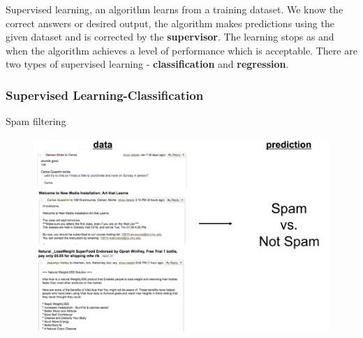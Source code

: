 \documentclass[9pt]{beamer}
\begin{document}
\begin{CJK*}{GBK}{kai}
\begin{frame}
\begin{figure}[h]
\end{figure}
Supervised learning, an algorithm learns from a training dataset. We know the correct answers or desired output, the algorithm makes predictions using the given dataset and is corrected by the \textbf{supervisor}. The learning stops as and when the algorithm achieves a level of performance which is acceptable. There are two types of supervised learning - \textbf{classification} and \textbf{regression}.

\end{frame}

\begin{frame}
	\frametitle{Supervised Learning-Classification}
	\begin{block}{Spam filtering}
	\begin{figure}[h]
		\centering
		\includegraphics[scale=0.3]{SpamFiltering.png}
		
	\end{figure}
	\end{block}
    

\end{frame}
\end{CJK*}
\end{document}
